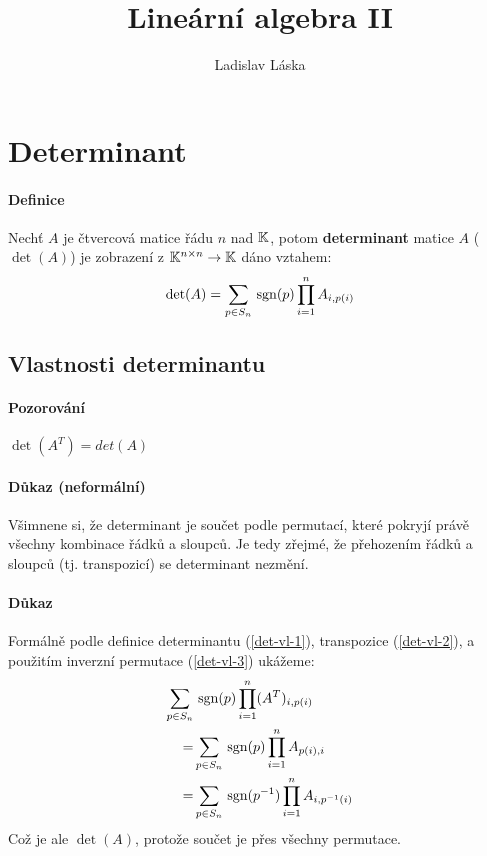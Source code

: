 \documentclass[a4paper,10pt]{article}
\title{Lineární algebra II}
\author{Ladislav Láska}
\begin{document}
\maketitle
\newpage
\tableofcontents
\newpage


\section{Determinant}

\paragraph{Definice}
Nechť $A$ je čtvercová matice řádu $n$ nad $\mathbb{K}$, potom \textbf{determinant} matice
$A$ ($\det(A)$) je zobrazení z $\mathbb{K}^{n \times n} \to \mathbb{K}$ dáno vztahem:
\begin{align*}
	\det(A) = \sum_{p \in S_n} \operatorname*{\,sgn} (p) \prod_{i=1}^n A_{i,p(i)}
\end{align*}

\subsection{Vlastnosti determinantu}
\setcounter{equation}{0}
\paragraph{Pozorování}
$\det(A^T) = det(A)$

\paragraph{Důkaz (neformální)}
Všimnene si, že determinant je součet podle permutací, které pokryjí právě
všechny kombinace řádků a sloupců. Je tedy zřejmé, že přehozením řádků a sloupců
(tj. transpozicí) se determinant nezmění. 

\paragraph{Důkaz}
Formálně podle definice determinantu (\ref{det-vl-1}), transpozice
(\ref{det-vl-2}), a použitím inverzní permutace (\ref{det-vl-3}) ukážeme:
\begin{align} 
	\sum_{p \in S_n} &\operatorname*{\,sgn} (p) \prod_{i=1}^n (A^T)_{i,p(i)} \label{det-vl-1} \\
	= & \sum_{p \in S_n} \operatorname*{\,sgn} (p) \prod_{i=1}^n A_{p(i),i} \label{det-vl-2}\\
	= & \sum_{p \in S_n} \operatorname*{\,sgn} (p^{-1}) \prod_{i=1}^n A_{i,p^{-1}(i)} \label{det-vl-3}
\end{align}
Což je ale $\det(A)$, protože součet je přes všechny permutace.
\end{document}
